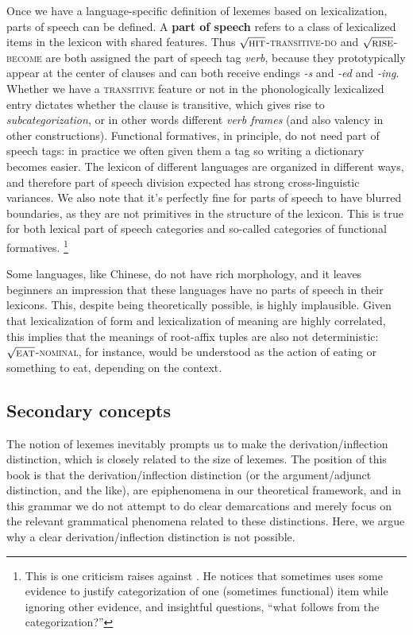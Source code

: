 \documentclass[UTF8, a4paper, oneside, scheme=plain, 12pt]{ctexrep}
\newcommand*{\concept}[1]{\textbf{#1}}
\newcommand*{\term}[1]{\emph{#1}}
\newcommand{\form}[1]{\emph{#1}}
\newcommand*{\category}[1]{\textsc{#1}}
\newcommand*{\wordroot}[1]{$\sqrt{\text{\textsc{#1}}}$}
\begin{document}
{Once we have a language-specific definition of lexemes based on lexicalization,
parts of speech can be defined.
A \concept{part of speech} refers to a class of lexicalized items in the lexicon with shared features.
Thus \wordroot{hit}-\category{transitive}-\category{do}
and \wordroot{rise}-\category{become}
are both assigned the part of speech tag \term{verb},
because they prototypically appear at the center of clauses
and can both receive endings \form{-s} and \form{-ed} and \form{-ing}.
Whether we have a \category{transitive} feature or not in the phonologically lexicalized entry
dictates whether the clause is transitive,
which gives rise to \term{subcategorization}, or in other words different \term{verb frames}
(and also valency in other constructions).
Functional formatives, in principle, do not need part of speech tags:
in practice we often given them a tag so writing a dictionary becomes easier.
The lexicon of different languages are organized in different ways,
and therefore part of speech division expected has strong cross-linguistic variances.
We also note that it's perfectly fine for parts of speech to have blurred boundaries,
as they are not primitives in the structure of the lexicon.
This is true for both lexical part of speech categories and
so-called categories of functional formatives.%
\footnote{
    This is one criticism \citet{culicover2004cambridge} raises against \citet{cgel}.
    He notices that \citet{cgel} sometimes uses some evidence to 
    justify categorization of one (sometimes functional) item while ignoring other evidence,
    and insightful questions, ``what follows from the categorization?''
}

Some languages, like Chinese, do not have rich morphology,
and it leaves beginners an impression that these languages have no parts of speech in their lexicons.
This, despite being theoretically possible, is highly implausible.
Given that lexicalization of form and lexicalization of meaning are highly correlated,
this implies that the meanings of root-affix tuples are also not deterministic:
\wordroot{eat}-\category{nominal}, for instance,
would be understood as the action of eating or something to eat, 
depending on the context.

\subsection{Secondary concepts}

The notion of lexemes 
inevitably prompts us to make the derivation/inflection distinction,
which is closely related to the size of lexemes.
The position of this book is that 
the derivation/inflection distinction
(or the argument/adjunct distinction, and the like), are epiphenomena in our theoretical framework,
and in this grammar we do not attempt to do clear demarcations 
and merely focus on the relevant grammatical phenomena related to these distinctions.
Here, we argue why a clear derivation/inflection distinction is not possible.

}
\end{document}
